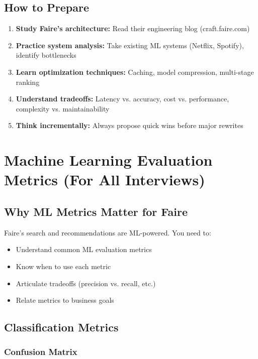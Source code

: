 \documentclass[11pt,letterpaper]{article}
\begin{document}
\subsection{How to Prepare}

\begin{enumerate}
    \item \textbf{Study Faire's architecture:} Read their engineering blog (craft.faire.com)
    \item \textbf{Practice system analysis:} Take existing ML systems (Netflix, Spotify), identify bottlenecks
    \item \textbf{Learn optimization techniques:} Caching, model compression, multi-stage ranking
    \item \textbf{Understand tradeoffs:} Latency vs. accuracy, cost vs. performance, complexity vs. maintainability
    \item \textbf{Think incrementally:} Always propose quick wins before major rewrites
\end{enumerate}

\section{Machine Learning Evaluation Metrics (For All Interviews)}

\subsection{Why ML Metrics Matter for Faire}

Faire's search and recommendations are ML-powered. You need to:
\begin{itemize}
    \item Understand common ML evaluation metrics
    \item Know when to use each metric
    \item Articulate tradeoffs (precision vs. recall, etc.)
    \item Relate metrics to business goals
\end{itemize}

\subsection{Classification Metrics}

\subsubsection{Confusion Matrix}
\end{document}
